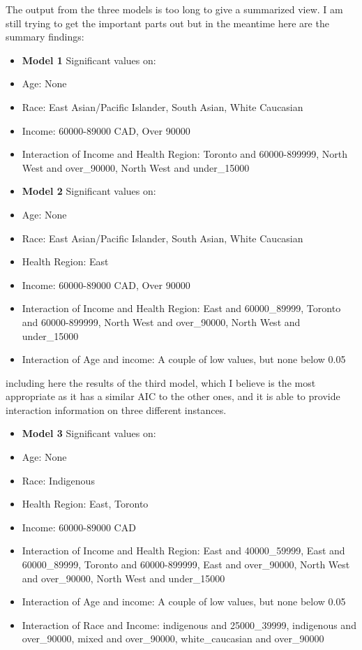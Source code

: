 \documentclass[
  letterpaper,
  DIV=11,
  numbers=noendperiod]{scrartcl}
\providecommand{\tightlist}{%
  \setlength{\itemsep}{0pt}\setlength{\parskip}{0pt}}\usepackage{longtable,booktabs,array}
\begin{document}
The output from the three models is too long to give a summarized view.
I am still trying to get the important parts out but in the meantime
here are the summary findings:

\begin{itemize}
\item
  \textbf{Model 1} Significant values on:
\item
  Age: None
\item
  Race: East Asian/Pacific Islander, South Asian, White Caucasian
\item
  Income: 60000-89000 CAD, Over 90000
\item
  Interaction of Income and Health Region: Toronto and 60000-899999,
  North West and over\_90000, North West and under\_15000
\item
  \textbf{Model 2} Significant values on:
\item
  Age: None
\item
  Race: East Asian/Pacific Islander, South Asian, White Caucasian
\item
  Health Region: East
\item
  Income: 60000-89000 CAD, Over 90000
\item
  Interaction of Income and Health Region: East and 60000\_89999,
  Toronto and 60000-899999, North West and over\_90000, North West and
  under\_15000
\item
  Interaction of Age and income: A couple of low values, but none below
  0.05
\end{itemize}

including here the results of the third model, which I believe is the
most appropriate as it has a similar AIC to the other ones, and it is
able to provide interaction information on three different instances.

\begin{itemize}
\tightlist
\item
  \textbf{Model 3} Significant values on:
\item
  Age: None
\item
  Race: Indigenous
\item
  Health Region: East, Toronto
\item
  Income: 60000-89000 CAD
\item
  Interaction of Income and Health Region: East and 40000\_59999, East
  and 60000\_89999, Toronto and 60000-899999, East and over\_90000,
  North West and over\_90000, North West and under\_15000
\item
  Interaction of Age and income: A couple of low values, but none below
  0.05
\item
  Interaction of Race and Income: indigenous and 25000\_39999,
  indigenous and over\_90000, mixed and over\_90000, white\_caucasian
  and over\_90000
\end{itemize}
\end{document}
